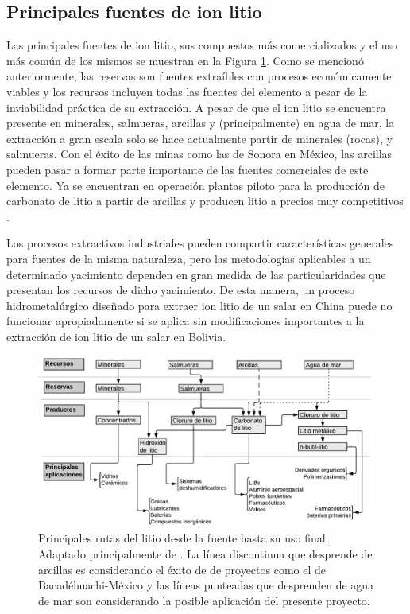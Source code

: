 \subsection{Principales fuentes de ion litio}
Las principales fuentes de ion litio, sus compuestos más comercializados y el uso más común de los mismos se muestran en la Figura \ref{fig:esquemaSpiers}. Como se mencionó anteriormente, las reservas son fuentes extraíbles con procesos económicamente viables y los recursos incluyen todas las fuentes del elemento a pesar de la inviabilidad práctica de su extracción. A pesar de que el ion litio se encuentra presente en minerales, salmueras, arcillas y (principalmente) en agua de mar, la extracción a gran escala solo se hace actualmente partir de minerales (rocas), y salmueras. Con el éxito de las minas como las de Sonora en México, las arcillas pueden pasar a formar parte importante de las fuentes comerciales de este elemento. Ya se encuentran en operación plantas piloto para la producción de carbonato de litio a partir de arcillas y producen litio a precios muy competitivos \citep{Bacanora2018}.

Los procesos extractivos industriales pueden compartir características generales para fuentes de la misma naturaleza, pero las metodologías aplicables a un determinado yacimiento dependen en gran medida de las particularidades que presentan los recursos de dicho yacimiento. De esta manera, un proceso hidrometalúrgico diseñado para extraer ion litio de un salar en China puede no funcionar apropiadamente si se aplica sin modificaciones importantes a la extracción de ion litio de un salar en Bolivia.

{
\begin{figure}[H]
    \centering
    \includegraphics[width=\textwidth]{chap2/images/lithiumsoourcetoeum.pdf}
    \caption[Principales rutas del litio desde la fuente hasta su uso final.]{Principales rutas del litio desde la fuente hasta su uso final. Adaptado principalmente de \citet{SPEIRS2014}. La línea discontinua que desprende de arcillas es considerando el éxito de de proyectos como el de Bacadéhuachi-México y las líneas punteadas que desprenden de agua de mar son considerando la posible aplicación del presente proyecto.}
    \label{fig:esquemaSpiers}
\end{figure}
}

